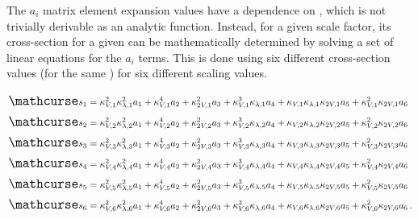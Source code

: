     The $a_i$ matrix element expansion values have a dependence on \mhh, which is not trivially derivable as an analytic function.
    Instead, for a given scale factor,
        its cross-section for a given \mhh can be mathematically determined by solving a set of linear equations for the $a_i$ terms.
    This is done using six different cross-section values (for the same \mhh) for six different scaling values.


    \begin{eqnarray} \label{eq:allsixxsecs}
        \crossterm{1} \nonumber \\
        \crossterm{2} \nonumber \\
        \crossterm{3} \nonumber \\
        \crossterm{4} \nonumber \\
        \crossterm{5} \nonumber \\
        \crossterm{6} \nonumber \,. \\
    \end{eqnarray}

